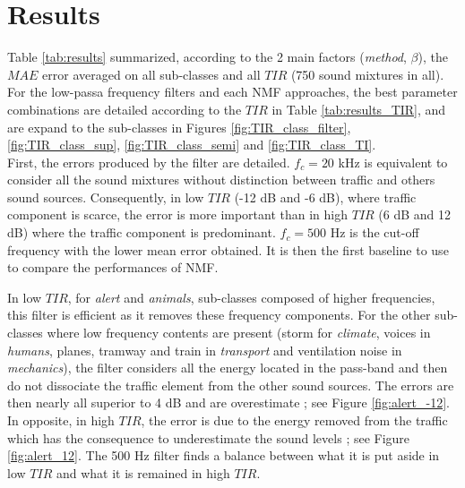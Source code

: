 \documentclass[twocolumn,a4paper,10pt]{article}
\begin{document}
\section{Results}\label{part:results}

Table \ref{tab:results} summarized, according to the 2 main factors (\textit{method}, $\beta$), the $MAE$ error averaged on all sub-classes and all $TIR$ (750 sound mixtures in all). For the low-passa frequency filters and each NMF approaches, the best parameter combinations are detailed according to the $TIR$ in Table \ref{tab:results_TIR},  and are expand to the sub-classes in Figures \ref{fig:TIR_class_filter}, \ref{fig:TIR_class_sup}, \ref{fig:TIR_class_semi} and \ref{fig:TIR_class_TI}. \\

First, the errors produced by the filter are detailed. $f_c = 20 $ kHz is equivalent to consider all the sound mixtures without distinction between traffic and others sound sources. Consequently, in low $TIR$ (-12 dB and -6 dB), where traffic component is scarce, the error is more important than in high $TIR$ (6 dB and 12 dB) where the traffic component is predominant. $f_c = 500$ Hz is the cut-off frequency with the lower mean error obtained. It is then the first baseline to use to compare the performances of NMF.

In low $TIR$, for \textit{alert} and \textit{animals}, sub-classes composed of higher frequencies, this filter is efficient as it removes these frequency components. For the other sub-classes where low frequency contents are present (storm for \textit{climate}, voices in \textit{humans}, planes, tramway and train in \textit{transport} and ventilation noise in \textit{mechanics}), the filter considers all the energy located in the pass-band and then do not dissociate the traffic element from the other sound sources. The errors are then nearly all superior to 4 dB and are overestimate ; see Figure \ref{fig:alert_-12}. In opposite, in high $TIR$, the error is due to the energy removed from the traffic which has the consequence to underestimate the sound levels ; see Figure \ref{fig:alert_12}. The 500 Hz filter finds a balance between what it is put aside in low $TIR$ and what it is remained in high $TIR$. \\
\end{document}
